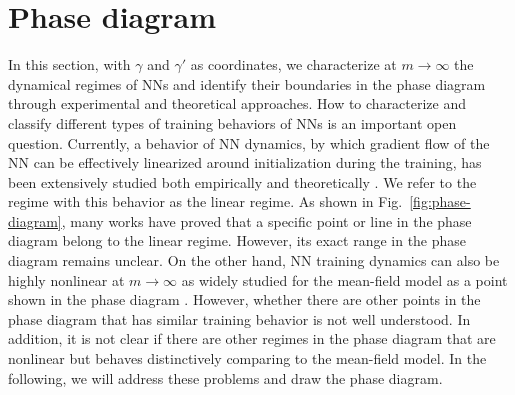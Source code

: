 \documentclass{article}
\begin{document}
\section{Phase diagram}
In this section, with $\gamma$ and $\gamma'$ as coordinates, we characterize at $m\to\infty$ the dynamical regimes of NNs and identify their boundaries in the phase diagram through experimental and theoretical approaches.
How to characterize and classify different types of training behaviors of NNs is an important open question.  Currently, a behavior of NN dynamics, by which gradient flow of the NN can be effectively linearized around initialization during the training, has been extensively studied both empirically and theoretically \cite{jacot_neural_2018,lee_wide_2019,arora2019exact,e2020comparative}. We refer to the regime with this behavior as the linear regime. As shown in Fig.~\ref{fig:phase-diagram}, many works have proved that a specific point or line in the phase diagram belong to the linear regime. However, its exact range in the phase diagram remains unclear. On the other hand, NN training dynamics can also be highly nonlinear at $m\to\infty$ as widely studied for the mean-field model as a point shown in the phase diagram \cite{mei_mean_2018,sirignano_mean_2020,rotskoff_parameters_2018}. However, whether there are other points in the phase diagram that has similar training behavior is not well understood. In addition, it is not clear if there are other regimes in the phase diagram that are nonlinear but behaves distinctively comparing to the mean-field model. In the following, we will address these problems and draw the phase diagram.
\end{document}
